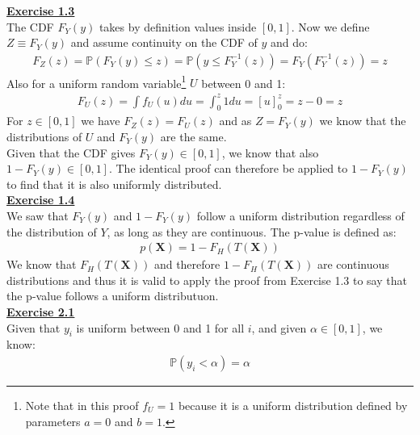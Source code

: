 \documentclass[a4paper, 11pt]{article}
\begin{document}
\newline \textbf{\underline{Exercise 1.3}}\\
\newline The CDF $F_Y(y)$ takes by definition values inside $[0, 1]$. Now we define $Z \equiv F_Y(y)$ and assume continuity on the CDF of $y$ and do:
\begin{eqnarray}
F_Z (z) = \mathbb{P}(F_Y(y) \leq z) = \mathbb{P}(y \leq F_Y^{-1}(z)) = F_Y(F_Y^{-1}(z)) = z \nonumber
\end{eqnarray}
Also for a uniform random variable\footnote{Note that in this proof $f_U = 1$ because it is a uniform distribution defined by parameters $a=0$ and $b=1$.} $U$ between 0 and 1:
\begin{eqnarray}
F_U (z) = \int f_U (u) du = \int_0^z 1 du = [u]_{0}^{z} = z - 0 = z \nonumber
\end{eqnarray}
For $z \in [0,1]$ we have $F_Z (z) = F_U (z)$ and as $Z = F_Y(y)$ we know that the distributions of $U$ and $F_Y(y)$ are the same.\\
\newline Given that the CDF gives $F_Y(y) \in [0,1]$, we know that also $1 - F_Y(y) \in [0,1]$. The identical proof can therefore be applied to $1 - F_Y(y)$ to find that it is also uniformly distributed.\\
\newline \textbf{\underline{Exercise 1.4}}\\
\newline We saw that $F_Y (y)$ and $1-F_Y (y)$ follow a uniform distribution regardless of the distribution of $Y$, as long as they are continuous. The p-value is defined as:
\begin{eqnarray}
p(\mathbf{X})=1 - F_H(T(\mathbf{X})) \nonumber
\end{eqnarray}
We know that $F_H(T(\mathbf{X}))$ and therefore $1-F_H(T(\mathbf{X}))$ are continuous distributions and thus it is valid to apply the proof from Exercise 1.3 to say that the p-value follows a uniform distributuon.\\
\newline \textbf{\underline{Exercise 2.1}}\\
\newline Given that $y_i$ is uniform between 0 and 1 for all $i$, and given $\alpha \in [0,1]$, we know:
\begin{eqnarray}
\mathbb{P}(y_i < \alpha) = \alpha \nonumber
\end{eqnarray}
\end{document}
